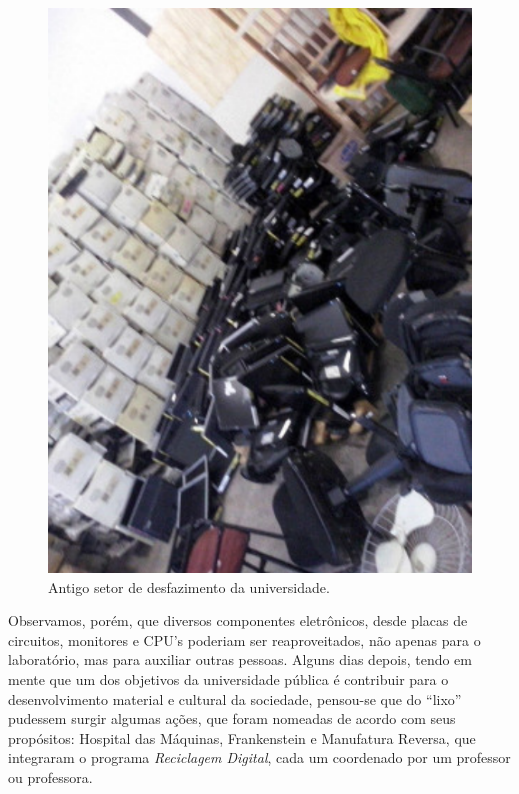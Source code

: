 \documentclass[a4paper]{ifacconf}
\begin{document}
\begin{figure}
	\begin{center}
		\includegraphics[scale=0.7, angle=270]{figuras/desfazimento-UFOP-2016.pdf}    
		\caption{Antigo setor de desfazimento da universidade.} 
		\label{fig:desfazimento}
	\end{center}
\end{figure}

Observamos, porém, que diversos componentes eletrônicos, desde placas de circuitos, monitores e CPU's poderiam ser reaproveitados, não apenas para o laboratório, mas para auxiliar outras pessoas. Alguns dias depois, tendo em mente que um dos objetivos da universidade pública é contribuir para o desenvolvimento material e cultural da sociedade, pensou-se que do ``lixo'' pudessem surgir algumas ações, que foram nomeadas de acordo com seus propósitos: Hospital das Máquinas, Frankenstein e Manufatura Reversa, que integraram o programa \emph{Reciclagem Digital}, cada um coordenado por um professor ou professora.
\end{document}
